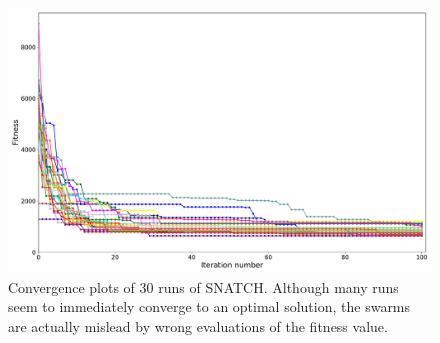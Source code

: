 \documentclass[utf8]{frontiersFPHY} %
\newcommand {\name}{SNATCH}
\begin{document}
\begin{figure}[!ht]
    \centering
    \includegraphics[width=\textwidth]{images/failed-starfish/fitness-each-optimization.pdf}
    \caption{Convergence plots of 30 runs of \name{}. Although many runs seem to immediately converge to an optimal solution, the swarms are actually mislead by wrong evaluations of the fitness value. }
    \label{fig:starfishall}
\end{figure}


\end{document}
